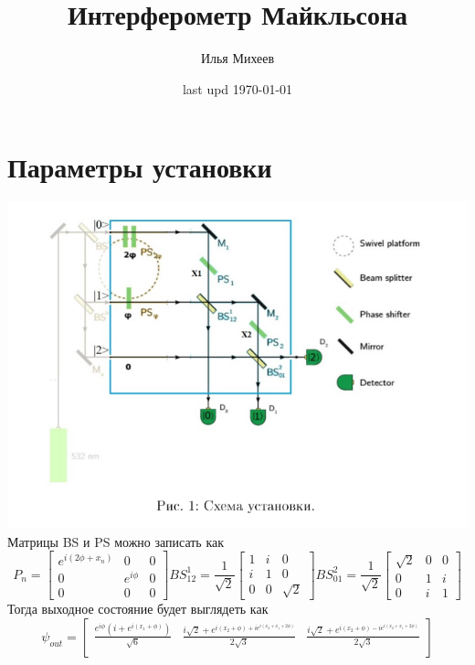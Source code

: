 \documentclass[a4paper,12pt]{article} %
\author{Илья Михеев}
\title{Интерферометр Майкльсона}
\date{last upd \today  }
\theoremstyle{definition}
\begin{document}
	
	\maketitle 
	\section{Параметры установки}
	\includegraphics{Mint.png}
	Матрицы BS и PS можно записать как 
	\begin{equation*}
		P_n = \begin{bmatrix}
			e^{i(2\phi + x_n)}&0  & 0\\ 
			0& e^{i \phi} & 0\\ 
			0& 0 & 0
		\end{bmatrix}
	BS^1_{12} = \frac{1}{\sqrt{2}}\begin{bmatrix}
		1&i  & 0\\ 
		i&  1& 0\\ 
		0& 0 & \sqrt{2}
	\end{bmatrix}
	BS^2_{01} = \frac{1}{\sqrt{2}} \begin{bmatrix}
		\sqrt{2}&0  &0 \\ 
		0& 1 &i \\ 
		0& i & 1
	\end{bmatrix}
	\end{equation*}
	Тогда выходное состояние будет выглядеть как
	\begin{equation*}
		\psi_{out} = \begin{bmatrix}
		\frac{e^{i \phi}(i + e^{i(x_1 + \phi)})}{\sqrt{6}}&\frac{i \sqrt{2} + e^{i(x_2 + \phi) + i e^{i(x_2+x_1+2\phi)}}}{2 \sqrt{3}}&\frac{i \sqrt{2} + e^{i(x_2 + \phi) - i e^{i(x_2+x_1+2\phi)}}}{2 \sqrt{3}} \\ 
		\end{bmatrix}
	\end{equation*}
\end{document}
